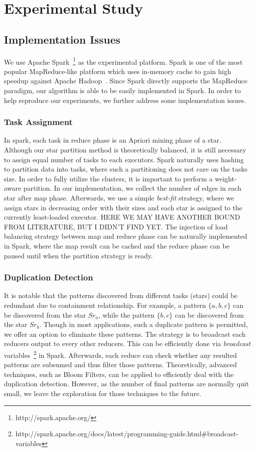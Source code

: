 \section{Experimental Study}
\label{sec:exp}
\subsection{Implementation Issues}
We use Apache Spark~\footnote{http://spark.apache.org/} as the experimental
platform. Spark is one of the most popular MapReduce-like platform which
uses in-memory cache to gain high speedup against Apache Hadoop~\cite{}. Since
Spark directly supports the MapReduce paradigm, our algorithm is able to 
be easily implemented in Spark. In order to help reproduce our experiments,
we further address some implementation issues.
\subsubsection{Task Assignment}
In spark, each task in reduce phase is an Apriori mining phase of 
a star.
Although our star partition method is theoretically balanced, 
it is still necessary to assign equal number of tasks to each executors. 
Spark naturally uses hashing to partition data into tasks, where such
a partitioning does not care on the tasks size. In order to
fully utilize the clusters, it is important to perform a weight-aware
partition. In our implementation, we collect the number of edges
in each star after map phase. Afterwards, we use a simple \emph{best-fit} strategy,
where we assign stars in decreasing order with their sizes and each star
is assigned to the currently least-loaded executor.  HERE WE MAY HAVE ANOTHER BOUND
FROM LITERATURE, BUT I DIDN'T FIND YET. The injection of load balancing strategy
between map and reduce phase can be naturally implemented in Spark, where the 
map result can be cached and the reduce phase can be paused until when the
partition strategy is ready.

\subsubsection{Duplication Detection}
It is notable that the patterns discovered from different tasks (stars) could
be redundant due to containment relationship. For example, a pattern $\{a,b,c\}$
can be discovered from the star $Sr_a$, while the pattern $\{b,c\}$ can be discovered
from the star $Sr_b$. Though in most applications, such a duplicate pattern
is permitted, we offer an option to eliminate these patterns. The strategy is 
to broadcast each reducers output to every other reducers. This can be
efficiently done via \emph{broadcast} variables~\footnote{http://spark.apache.org/docs/latest/programming-guide.html\#broadcast-variables} in Spark. Afterwards, each reduce can check 
whether any resulted patterns are subsumed and thus filter those patterns.
Theoretically, advanced techniques, such as Bloom Filters, can be applied to efficiently
deal with the duplication detection. However, as the number of final patterns are
normally quit small, we leave the exploration for those techniques to the future.

